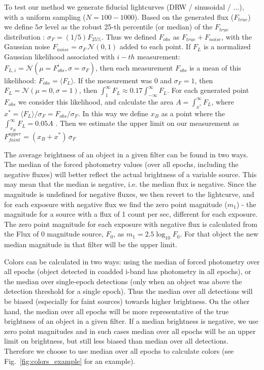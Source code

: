 \documentclass[fleqn,usenatbib]{mnras}  %
\begin{document}
To test our method we generate fiducial lightcurves (DRW / sinusoidal / ...), with a uniform sampling ($N=100-1000$). Based on the generated flux ($F_{true}$) we define $5\sigma$ level as the robust 25-th percentile (or median) of the $F_{true}$ distribution :  $\sigma_{F} = (1/5)  F_{25 \%}$. Thus we defined $F_{obs}$ as $F_{true} + F_{noise}$, with the Gaussian noise $F_{noise} = \sigma_{F}  \, \mathcal{N}(0,1)$ added to each point. 
If $F_{L}$ is a normalized Gaussian  likelihood associated with $i-th$ measurement: $F_{L,i} = \mathcal{N}(\mu=F_{obs}^{i}, \sigma=\sigma_{F})$, then  each measurement $F_{obs}$ is a mean of this likelihood: $F_{obs} = \langle F_{L} \rangle$. If the measurement was $0$ and $\sigma_{F} = 1$, then  $F_{L} = \mathcal{N}(\mu=0,\sigma=1)$, then  $\int_{1} ^{\infty} {F_{L}} \approx 0.17  \int_{-\infty}^{\infty}{F_{L}} $.      For each generated point $F_{obs}$  we consider this likelihood, and calculate the area $A = \int_{x^{*}}^{\infty} {F_{L}}$, where   $x^{*} = \langle F_{L} \rangle / \sigma_{F} =  F_{obs} / \sigma_{F}$. In this way we define $x_{B}$ as a  point where the $ \int_{x_{B}} ^{\infty} {F_{L}}= 0.05 A$  . Then  we estimate the upper limit on our measurement  as  $F_{faint} ^ {upper} = (x_{B} + x^{*}) \, \sigma_{F}$




The average brightness of an object in  a given filter can be found in two ways. The median of the forced photometry values (over all epochs, including the negative fluxes)   will better reflect the actual brightness of a variable source. This may mean that the median is negative, i.e. the median flux is negative. Since the magnitude is undefined for negative fluxes, we then revert to the lightcurve, and for each exposure with negative flux we find the zero point magnitude ($m_1$) - the magnitude for a source with a flux of 1 count per sec, different for each exposure.  The zero point magnitude for each exposure with negative flux is calculated from the  Flux of 0 magnitude source,  $F_0$,  as  $m_{1} = 2.5 \log_{10}{F_{0}}$. For that object the new median magnitude in that filter will be the upper limit. 

Colors can be calculated in two ways: using the median of forced photometry over all epochs (object detected in coadded i-band has photometry in all epochs), or the median over single-epoch detections (only when an object was above the detection threshold for a single epoch).  
Thus the median over all detections will be biased (especially for faint sources) towards higher brightness.  On the other hand, the median over all epochs will be more representative of the true brightness of an object in a given filter.  If a median brightness is negative, we use zero point magnitudes and in such cases median over all epochs will be an upper limit on brightness, but still less biased than median over all detections. Therefore  we choose to use median over all epochs to calculate colors (see Fig.~\ref{fig:colors_example} for an example).  
\end{document}

